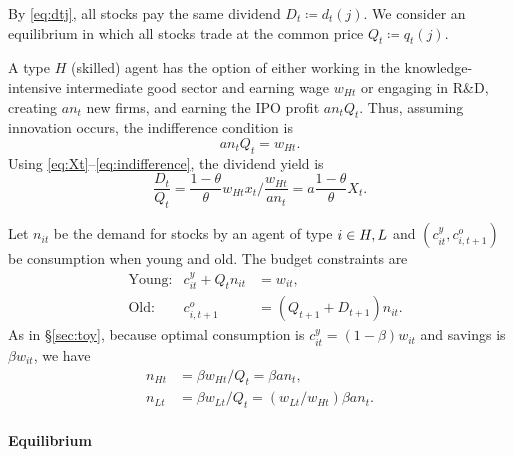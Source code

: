 \documentclass[a4paper,12pt]{article}
\numberwithin{equation}{section}
\theoremstyle{plain}
\begin{document}
By \eqref{eq:dtj}, all stocks pay the same dividend $D_t\coloneqq d_t(j)$. We consider an equilibrium in which all stocks trade at the common price $Q_t\coloneqq q_t(j)$.

A type $H$ (skilled) agent has the option of either working in the knowledge-intensive intermediate good sector and earning wage $w_{Ht}$ or engaging in R\&D, creating $an_t$ new firms, and earning the IPO profit $an_tQ_t$. Thus, assuming innovation occurs, the indifference condition is
\begin{equation}
    an_tQ_t=w_{Ht}. \label{eq:indifference}
\end{equation}
Using \eqref{eq:Xt}--\eqref{eq:indifference}, the dividend yield is
\begin{equation}
    \frac{D_t}{Q_t}=\frac{1-\theta}{\theta}w_{Ht}x_t/\frac{w_{Ht}}{an_t}=a\frac{1-\theta}{\theta}X_t. \label{eq:divyield1}
\end{equation}

Let $n_{it}$ be the demand for stocks by an agent of type $i\in \set{H,L}$ and $(c_{it}^y,c_{i,t+1}^o)$ be consumption when young and old. The budget constraints are
\begin{subequations}\label{eq:budget_GH}
\begin{align}
    &\text{Young:} & c_{it}^y+Q_tn_{it}&=w_{it}, \label{eq:budget_GH_young}\\
    &\text{Old:} & c_{i,t+1}^o&=(Q_{t+1}+D_{t+1})n_{it}. \label{eq:budget_GH_old}
\end{align}
\end{subequations}
As in \S\ref{sec:toy}, because optimal consumption is $c_{it}^y=(1-\beta)w_{it}$ and savings is $\beta w_{it}$, we have
\begin{subequations}\label{eq:nHLt}
\begin{align}
    n_{Ht}&=\beta w_{Ht}/Q_t=\beta an_t, \label{eq:nHt}\\
    n_{Lt}&=\beta w_{Lt}/Q_t=(w_{Lt}/w_{Ht})\beta an_t. \label{eq:nLt}
\end{align}
\end{subequations}

\paragraph{Equilibrium}
\end{document}
